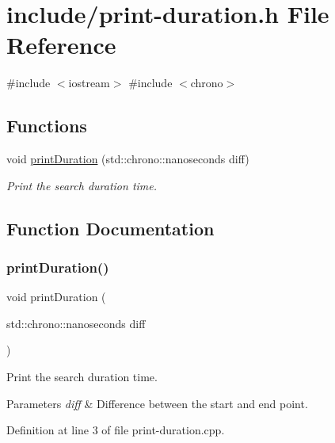 \hypertarget{print-duration_8h}{}\section{include/print-\/duration.h File Reference}
\label{print-duration_8h}
{\ttfamily \#include $<$iostream$>$}\newline
{\ttfamily \#include $<$chrono$>$}\newline
\subsection*{Functions}
\begin{DoxyCompactItemize}
\item 
void \mbox{\hyperlink{print-duration_8h_a4c1e331c0cba77ad1ab6588631c69dd4}{print\+Duration}} (std\+::chrono\+::nanoseconds diff)
\begin{DoxyCompactList}\small\item\em Print the search duration time. \end{DoxyCompactList}\end{DoxyCompactItemize}


\subsection{Function Documentation}
\mbox{\label{print-duration_8h_a4c1e331c0cba77ad1ab6588631c69dd4}} 
\subsubsection{\texorpdfstring{printDuration()}{printDuration()}}
{\footnotesize\ttfamily void print\+Duration (\begin{DoxyParamCaption}\item[{std\+::chrono\+::nanoseconds}]{diff }\end{DoxyParamCaption})}



Print the search duration time. 


\begin{DoxyParams}{Parameters}
{\em diff} & Difference between the start and end point. \\
\hline
\end{DoxyParams}


Definition at line 3 of file print-\/duration.\+cpp.

